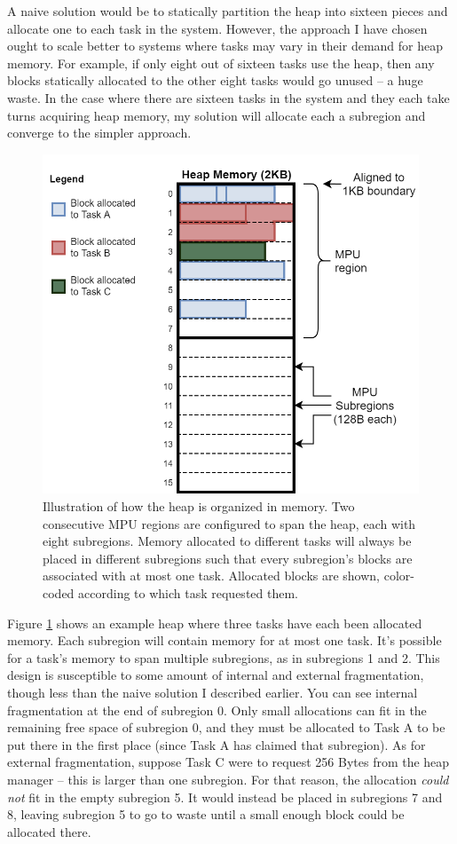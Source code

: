 A naive solution would be to statically partition the heap into sixteen pieces and allocate one to each task in the system. However, the approach I have chosen ought to scale better to systems where tasks may vary in their demand for heap memory. For example, if only eight out of sixteen tasks use the heap, then any blocks statically allocated to the other eight tasks would go unused -- a huge waste. In the case where there are sixteen tasks in the system and they each take turns acquiring heap memory, my solution will allocate each a subregion and converge to the simpler approach.

\begin{figure}[hbtp]
	\centering
	\includegraphics[width=0.7\linewidth]{figs/heap_prot.png}
	\caption{Illustration of how the heap is organized in memory. Two consecutive MPU regions are configured to span the heap, each with eight subregions. Memory allocated to different tasks will always be placed in different subregions such that every subregion's blocks are associated with at most one task. Allocated blocks are shown, color-coded according to which task requested them.}
	\label{fig:heap_prot}
\end{figure}

Figure \ref{fig:heap_prot} shows an example heap where three tasks have each been allocated memory. Each subregion will contain memory for at most one task. It's possible for a task's memory to span multiple subregions, as in subregions 1 and 2. This design is susceptible to some amount of internal and external fragmentation, though less than the naive solution I described earlier. You can see internal fragmentation at the end of subregion 0. Only small allocations can fit in the remaining free space of subregion 0, and they must be allocated to Task A to be put there in the first place (since Task A has claimed that subregion). As for external fragmentation, suppose Task C were to request 256 Bytes from the heap manager -- this is larger than one subregion. For that reason, the allocation \textit{could not} fit in the empty subregion 5. It would instead be placed in subregions 7 and 8, leaving subregion 5 to go to waste until a small enough block could be allocated there.

